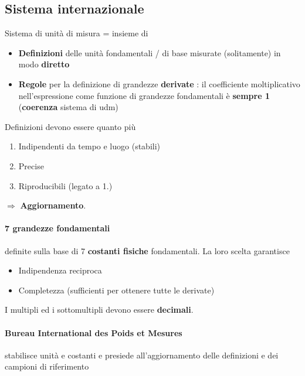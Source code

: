 \documentclass[10pt, oneside]{book}
\begin{document}
\subsection{Sistema internazionale}
Sistema di unità di misura = insieme di 
\begin{itemize}
\item \textbf{Definizioni} delle unità fondamentali / di base misurate (solitamente) in modo \textbf{diretto}
\item \textbf{Regole} per la definizione di grandezze \textbf{derivate} : il coefficiente moltiplicativo nell'espressione come funzione di grandezze fondamentali è \textbf{sempre 1} (\textbf{coerenza} sistema di udm)
\end{itemize}
Definizioni devono essere quanto più
\begin{enumerate}
\item Indipendenti da tempo e luogo (stabili)
\item Precise
\item Riproducibili (legato a 1.)
\end{enumerate}
$\Rightarrow$ \textbf{Aggiornamento}.

\paragraph{7 grandezze fondamentali} definite sulla base di 7 \textbf{costanti fisiche} fondamentali. La loro scelta garantisce
\begin{itemize}
\item Indipendenza reciproca
\item Completezza (sufficienti per ottenere tutte le derivate)
\end{itemize}
I multipli ed i sottomultipli devono essere \textbf{decimali}.

\paragraph{Bureau International des Poids et Mesures} stabilisce unità e costanti e presiede all'aggiornamento delle definizioni e dei campioni di riferimento
\end{document}
